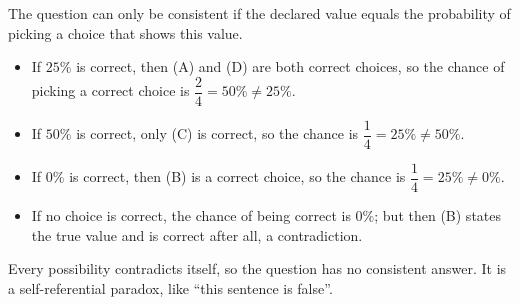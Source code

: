 The question can only be consistent if the declared value equals the probability of picking a choice that shows this value.
\begin{itemize}
\item If $25\%$ is correct, then (A) and (D) are both correct choices, so the chance of picking a correct choice is $\dfrac{2}{4}=50\%\ne25\%$.
\item If $50\%$ is correct, only (C) is correct, so the chance is $\dfrac{1}{4}=25\%\ne50\%$.
\item If $0\%$ is correct, then (B) is a correct choice, so the chance is $\dfrac{1}{4}=25\%\ne0\%$.
\item If no choice is correct, the chance of being correct is $0\%$; but then (B) states the true value and is correct after all, a contradiction.
\end{itemize}
Every possibility contradicts itself, so the question has no consistent answer. It is a self-referential paradox, like ``this sentence is false''.
